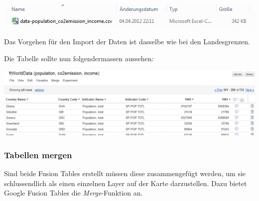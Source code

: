 \includegraphics{images/usecase1-worlddata/worlddata-data_csv.png}

Das Vorgehen für den Import der Daten ist dasselbe wie bei den Landesgrenzen.

Die Tabelle sollte nun folgendermassen aussehen:

\includegraphics[scale=0.5]{images/usecase1-worlddata/worlddata-data_import_done.png}

\subsubsection{Tabellen mergen}
Sind beide Fusion Tables erstellt müssen diese zusammengefügt werden, um sie schlussendlich als einen einzelnen Layer auf der Karte darzustellen. Dazu bietet Google Fusion Tables die \emph{Merge}-Funktion an. 

